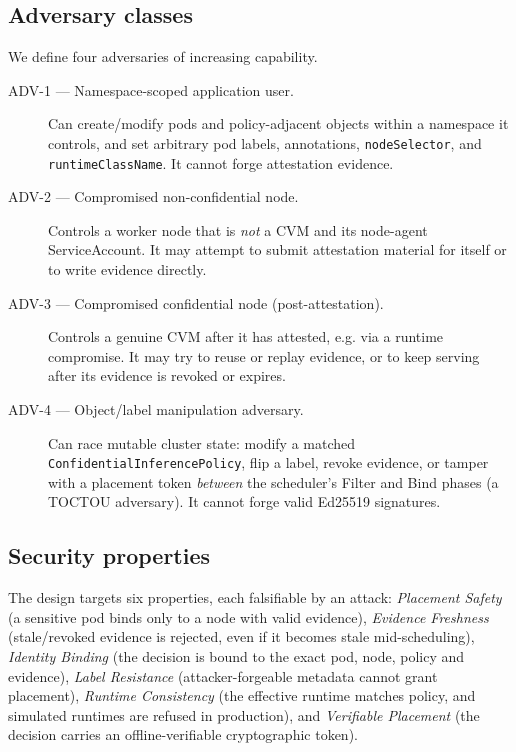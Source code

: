 \subsection{Adversary classes}
We define four adversaries of increasing capability.

\begin{description}
  \item[ADV-1 — Namespace-scoped application user.] Can create/modify pods and
  policy-adjacent objects within a namespace it controls, and set arbitrary
  pod labels, annotations, \texttt{nodeSelector}, and \texttt{runtimeClassName}.
  It cannot forge attestation evidence.
  \item[ADV-2 — Compromised non-confidential node.] Controls a worker node that
  is \emph{not} a CVM and its node-agent ServiceAccount. It may attempt to
  submit attestation material for itself or to write evidence directly.
  \item[ADV-3 — Compromised confidential node (post-attestation).] Controls a
  genuine CVM after it has attested, e.g. via a runtime compromise. It may try
  to reuse or replay evidence, or to keep serving after its evidence is revoked
  or expires.
  \item[ADV-4 — Object/label manipulation adversary.] Can race mutable cluster
  state: modify a matched \texttt{ConfidentialInferencePolicy}, flip a label,
  revoke evidence, or tamper with a placement token \emph{between} the
  scheduler's Filter and Bind phases (a TOCTOU adversary). It cannot forge
  valid Ed25519 signatures.
\end{description}

\subsection{Security properties}
The design targets six properties, each falsifiable by an attack:
\emph{Placement Safety} (a sensitive pod binds only to a node with valid
evidence), \emph{Evidence Freshness} (stale/revoked evidence is rejected, even
if it becomes stale mid-scheduling), \emph{Identity Binding} (the decision is
bound to the exact pod, node, policy and evidence), \emph{Label Resistance}
(attacker-forgeable metadata cannot grant placement), \emph{Runtime
Consistency} (the effective runtime matches policy, and simulated runtimes are
refused in production), and \emph{Verifiable Placement} (the decision carries an
offline-verifiable cryptographic token).

